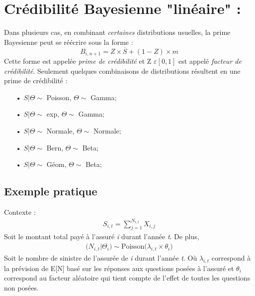 \section{Crédibilité Bayesienne "linéaire" :}
Dans plusieurs cas, en combinant \emph{certaines} distributions usuelles, la prime Bayesienne peut se réécrire sous la forme :
\begin{equation}
\label{equa:bayesienne}
B_{i,n+1} = Z \times \overline{S} + (1 - Z) \times m
\end{equation}
Cette forme est appelée \emph{prime de crédibilité} et Z $\varepsilon[0,1]$ est appelé \emph{facteur de crédibilité}.
Seulement quelques combinaisons de distributions résultent en une prime de crédibilité :
\begin{itemize}
\item[•] $S|\Theta \sim$ Poisson, $\Theta \sim$ Gamma;
\item[•] $S|\Theta \sim$ exp, $\Theta \sim$ Gamma;
\item[•] $S|\Theta \sim$ Normale, $\Theta \sim$ Normale;
\item[•] $S|\Theta \sim$ Bern, $\Theta \sim$ Beta;
\item[•] $S|\Theta \sim$ Géom, $\Theta \sim$ Beta;
\end{itemize}

\subsection*{Exemple pratique}
Contexte : 
\begin{align*}
S_{i,t} = \sum_{j = 1}^{N_{i,t}} X_{i,j} 
\end{align*}
Soit le montant total payé à l'assuré \textit{i} durant l'année \textit{t}. 
De plus,
\begin{align*}
\Bigg( N_{i,t}|\Theta_i \Bigg) \sim \text{Poisson} \Big( \lambda_{i,t} \times \theta_i \Big)
\end{align*}
Soit le nombre de sinistre de l'assurée de \textit{i} durant l'année \textit{t}. Où $\lambda_{i,t}$ correspond à la prévision de E[N] basé sur les réponses aux questions posées à l'assuré et $\theta_i$ correspond au facteur aléatoire qui tient compte de l'effet de toutes les questions non posées.

